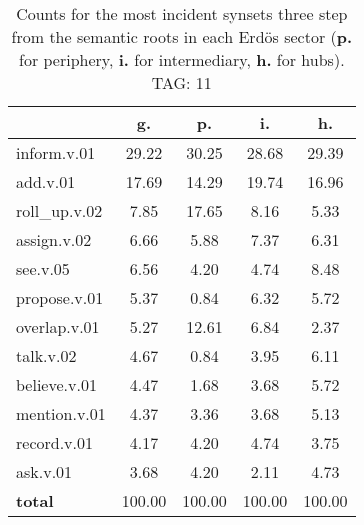 \begin{table}[h!]
\begin{center}
\begin{tabular}{| l | c | c | c | c |}\hline
 & g. & p. & i. & h. \\\hline
inform.v.01 & 29.22  & 30.25  & 28.68  & 29.39 \\\hline
add.v.01 & 17.69  & 14.29  & 19.74  & 16.96 \\\hline
roll\_up.v.02 & 7.85  & 17.65  & 8.16  & 5.33 \\\hline
assign.v.02 & 6.66  & 5.88  & 7.37  & 6.31 \\\hline
see.v.05 & 6.56  & 4.20  & 4.74  & 8.48 \\\hline
propose.v.01 & 5.37  & 0.84  & 6.32  & 5.72 \\\hline
overlap.v.01 & 5.27  & 12.61  & 6.84  & 2.37 \\\hline
talk.v.02 & 4.67  & 0.84  & 3.95  & 6.11 \\\hline
believe.v.01 & 4.47  & 1.68  & 3.68  & 5.72 \\\hline
mention.v.01 & 4.37  & 3.36  & 3.68  & 5.13 \\\hline
record.v.01 & 4.17  & 4.20  & 4.74  & 3.75 \\\hline
ask.v.01 & 3.68  & 4.20  & 2.11  & 4.73 \\\hline
{{\bf total}} & 100.00  & 100.00  & 100.00  & 100.00 \\\hline
\end{tabular}
\caption{Counts for the most incident synsets three step from the semantic roots in each Erd\"os sector ({\bf p.} for periphery, {\bf i.} for intermediary, {\bf h.} for hubs). TAG: 11}
\end{center}
\end{table}